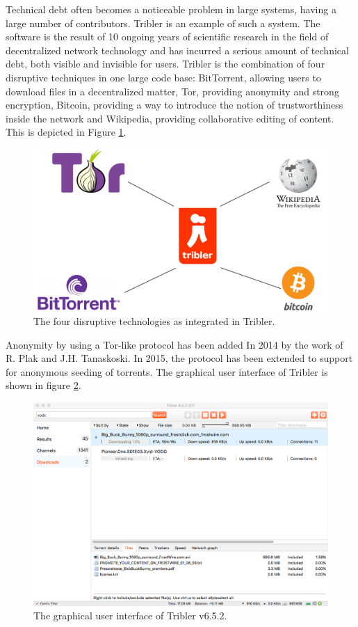 Technical debt often becomes a noticeable problem in large systems, having a large number of contributors. Tribler is an example of such a system. The software is the result of 10 ongoing years of scientific research in the field of decentralized network technology and has incurred a serious amount of technical debt, both visible and invisible for users.
Tribler is the combination of four disruptive techniques in one large code base: BitTorrent, allowing users to download files in a decentralized matter, Tor, providing anonymity and strong encryption, Bitcoin, providing a way to introduce the notion of trustworthiness inside the network and Wikipedia, providing collaborative editing of content. This is depicted in Figure \ref{fig:tribler-connections}.\\

\begin{figure}[!h]
	\centering
	\includegraphics[width=0.6\columnwidth]{images/introduction/tribler_connections}
	\caption{The four disruptive technologies as integrated in Tribler.}
	\label{fig:tribler-connections}
\end{figure}

Anonymity by using a Tor-like protocol has been added In 2014 by the work of R. Plak\cite{plak2014anonymous} and J.H. Tanaskoski\cite{tanaskoski2014anonymous}. 
In 2015, the protocol has been extended to support for anonymous seeding of torrents\cite{ruigrok2015bittorrent}.
The graphical user interface of Tribler is shown in figure \ref{fig:tribler-interface}.

\begin{figure}[!h]
	\centering
	\includegraphics[width=0.9\columnwidth]{images/introduction/tribler_interface}
	\caption{The graphical user interface of Tribler v6.5.2.}
	\label{fig:tribler-interface}
\end{figure}


